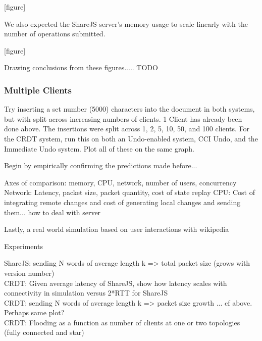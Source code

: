 \documentclass[12pt,a4paper,twoside,openright]{report}
\begin{document}
				[figure]
				
				We also expected the ShareJS server's memory usage to scale linearly with the number of operations submitted.
				
				[figure]
				
				Drawing conclusions from these figures..... TODO
				
				
			\subsubsection{Multiple Clients}
				Try inserting a set number (5000) characters into the document in both systems, but with split across increasing numbers of clients. 1 Client has already been done above. The insertions were split across 1, 2, 5, 10, 50, and 100 clients. For the CRDT system, run this on both an Undo-enabled system, CCI Undo, and the Immediate Undo system. Plot all of these on the same graph.
		
		
	
	
	
		Begin by empirically confirming the predictions made before... 
		
		Axes of comparison: memory, CPU, network, number of users, concurrency
			Network: Latency, packet size, packet quantity, cost of state replay
			CPU: Cost of integrating remote changes and cost of generating local changes and sending them... how to deal with server
			
		
			
		Lastly, a real world simulation based on user interactions with wikipedia
		
		
		Experiments
						
			

			ShareJS: sending N words of average length k => total packet size (grows with version number)\\
			CRDT: 	 Given average latency of ShareJS, show how latency scales with connectivity in simulation versus 2*RTT for ShareJS\\
			CRDT:	 sending N words of average length k => packet size growth ... cf above. Perhaps same plot?\\
			CRDT: 	 Flooding as a function as number of clients at one or two topologies (fully connected and star)\\
			
\end{document}
